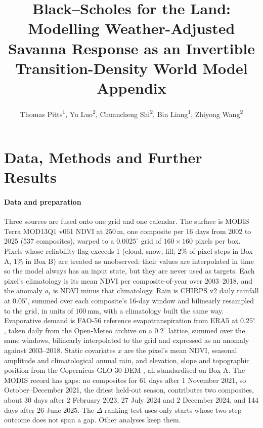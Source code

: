 \documentclass[letterpaper]{article} %
\title{Black--Scholes for the Land:\\ Modelling Weather-Adjusted Savanna Response as an Invertible Transition-Density World Model\\ Appendix}
\author{
    Thomas Pitts\textsuperscript{\rm 1},
    Yu Luo\textsuperscript{\rm 2},
    Chuancheng Shi\textsuperscript{\rm 2},
    Bin Liang\textsuperscript{\rm 1},
    Zhiyong Wang\textsuperscript{\rm 2}
}
\begin{document}
\maketitle

\section{Data, Methods and Further Results}
\paragraph{Data and preparation} Three sources are fused onto one grid and one calendar. The surface is MODIS Terra MOD13Q1 v061 NDVI \citep{mod13} at $250$\,m, one composite per 16 days from 2002 to 2025 (537 composites), warped to a $0.0025^\circ$ grid of $160\times160$ pixels per box. Pixels whose reliability flag exceeds 1 (cloud, snow, fill; $2\%$ of pixel-steps in Box A, $1\%$ in Box B) are treated as unobserved: their values are interpolated in time so the model always has an input state, but they are never used as targets. Each pixel's climatology is its mean NDVI per composite-of-year over 2003--2018, and the anomaly $a_t$ is NDVI minus that climatology. Rain is CHIRPS v2 daily rainfall \citep{chirps} at $0.05^\circ$, summed over each composite's 16-day window and bilinearly resampled to the grid, in units of $100$\,mm, with a climatology built the same way. Evaporative demand is FAO-56 reference evapotranspiration \citep{allen1998} from ERA5 at $0.25^\circ$ \citep{hersbach2020}, taken daily from the Open-Meteo archive on a $0.2^\circ$ lattice, summed over the same windows, bilinearly interpolated to the grid and expressed as an anomaly against 2003--2018. Static covariates $x$ are the pixel's mean NDVI, seasonal amplitude and climatological annual rain, and elevation, slope and topographic position from the Copernicus GLO-30 DEM \citep{copdem}, all standardised on Box A. The MODIS record has gaps: no composites for 61 days after 1 November 2021, so October--December 2021, the driest held-out season, contributes two composites, about 30 days after 2 February 2023, 27 July 2024 and 2 December 2024, and 144 days after 26 June 2025. The $\Delta$ ranking test uses only starts whose two-step outcome does not span a gap. Other analyses keep them.
\end{document}
